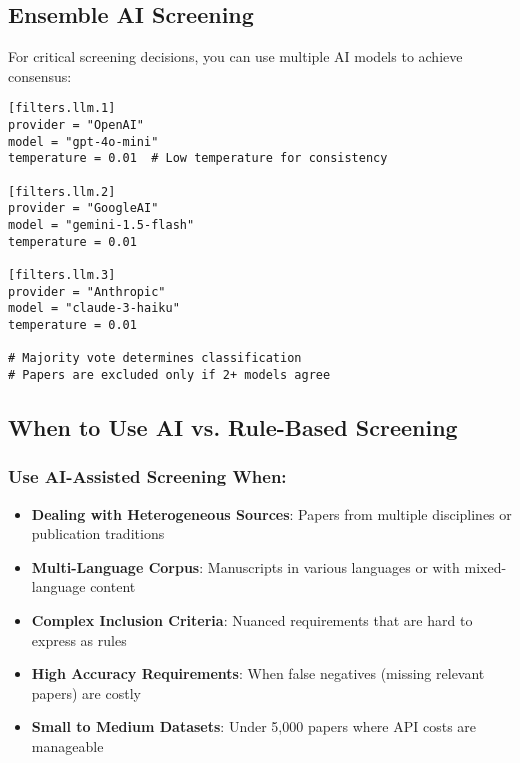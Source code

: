\subsection{Ensemble AI Screening}

For critical screening decisions, you can use multiple AI models to achieve consensus:

\begin{configbox}
\begin{lstlisting}
[filters.llm.1]
provider = "OpenAI"
model = "gpt-4o-mini"
temperature = 0.01  # Low temperature for consistency

[filters.llm.2]
provider = "GoogleAI"
model = "gemini-1.5-flash"
temperature = 0.01

[filters.llm.3]
provider = "Anthropic"
model = "claude-3-haiku"
temperature = 0.01

# Majority vote determines classification
# Papers are excluded only if 2+ models agree
\end{lstlisting}
\end{configbox}

\subsection{When to Use AI vs. Rule-Based Screening}

\subsubsection{Use AI-Assisted Screening When:}

\begin{itemize}
    \item \textbf{Dealing with Heterogeneous Sources}: Papers from multiple disciplines or publication traditions
    \item \textbf{Multi-Language Corpus}: Manuscripts in various languages or with mixed-language content
    \item \textbf{Complex Inclusion Criteria}: Nuanced requirements that are hard to express as rules
    \item \textbf{High Accuracy Requirements}: When false negatives (missing relevant papers) are costly
    \item \textbf{Small to Medium Datasets}: Under 5,000 papers where API costs are manageable
\end{itemize}

